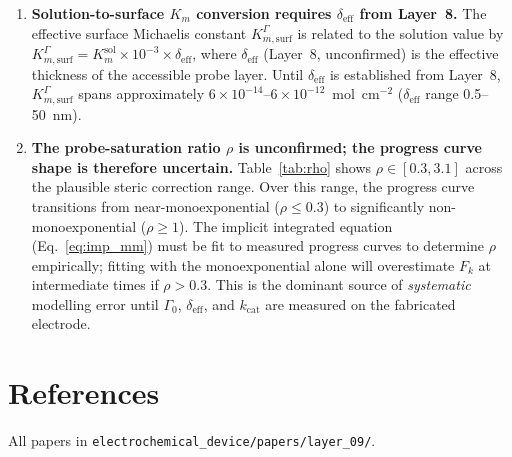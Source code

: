 \documentclass[10pt,a4paper]{article}
\numberwithin{equation}{section}
\newcommand{\kcat}{k_{\text{cat}}}
\newcommand{\Gz}{\Gamma_0}
\begin{document}
\begin{enumerate}[leftmargin=*]
  \item \textbf{Solution-to-surface $K_m$ conversion requires $\delta_{\text{eff}}$
    from Layer~8.}
    The effective surface Michaelis constant $K_{m,\text{surf}}^\Gamma$ is related to the
    solution value by $K_{m,\text{surf}}^\Gamma = K_m^{\text{sol}} \times 10^{-3} \times
    \delta_{\text{eff}}$, where $\delta_{\text{eff}}$ (Layer~8, unconfirmed) is the effective
    thickness of the accessible probe layer. Until $\delta_{\text{eff}}$ is established from
    Layer~8, $K_{m,\text{surf}}^\Gamma$ spans approximately $6\times10^{-14}$--$6\times10^{-12}$~mol~cm$^{-2}$
    ($\delta_{\text{eff}}$ range 0.5--50~nm).

  \item \textbf{The probe-saturation ratio $\rho$ is unconfirmed; the
    progress curve shape is therefore uncertain.}
    Table~\ref{tab:rho} shows $\rho \in [0.3, 3.1]$ across the plausible
    steric correction range. Over this range, the progress curve transitions
    from near-monoexponential ($\rho \leq 0.3$) to significantly non-monoexponential
    ($\rho \geq 1$). The implicit integrated equation
    (Eq.~\eqref{eq:imp_mm}) must be fit to measured progress curves to determine
    $\rho$ empirically; fitting with the monoexponential alone will overestimate
    $F_k$ at intermediate times if $\rho > 0.3$. This is the dominant source of
    \emph{systematic} modelling error until $\Gz$, $\delta_{\text{eff}}$, and
    $\kcat$ are measured on the fabricated electrode.

\end{enumerate}

\section*{References}

\noindent All papers in \texttt{electrochemical\_device/papers/layer\_09/}.
\end{document}
